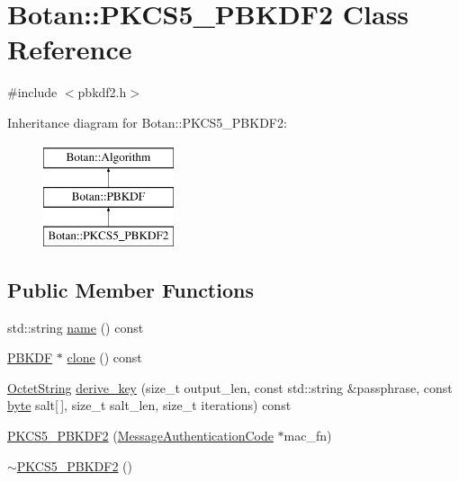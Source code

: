 \hypertarget{classBotan_1_1PKCS5__PBKDF2}{\section{Botan\-:\-:P\-K\-C\-S5\-\_\-\-P\-B\-K\-D\-F2 Class Reference}
\label{classBotan_1_1PKCS5__PBKDF2}
}


{\ttfamily \#include $<$pbkdf2.\-h$>$}

Inheritance diagram for Botan\-:\-:P\-K\-C\-S5\-\_\-\-P\-B\-K\-D\-F2\-:\begin{figure}[H]
\begin{center}
\leavevmode
\includegraphics[height=3.000000cm]{classBotan_1_1PKCS5__PBKDF2}
\end{center}
\end{figure}
\subsection*{Public Member Functions}
\begin{DoxyCompactItemize}
\item 
std\-::string \hyperlink{classBotan_1_1PKCS5__PBKDF2_af422ef3bbc7d0b053fe46a61c310fc0b}{name} () const 
\item 
\hyperlink{classBotan_1_1PBKDF}{P\-B\-K\-D\-F} $\ast$ \hyperlink{classBotan_1_1PKCS5__PBKDF2_a01646d05018139cc33ffca758caae423}{clone} () const 
\item 
\hyperlink{classBotan_1_1OctetString}{Octet\-String} \hyperlink{classBotan_1_1PKCS5__PBKDF2_ae40d8cd687ed0eb081ced526c56cfab4}{derive\-\_\-key} (size\-\_\-t output\-\_\-len, const std\-::string \&passphrase, const \hyperlink{namespaceBotan_a7d793989d801281df48c6b19616b8b84}{byte} salt\mbox{[}$\,$\mbox{]}, size\-\_\-t salt\-\_\-len, size\-\_\-t iterations) const 
\item 
\hyperlink{classBotan_1_1PKCS5__PBKDF2_a7a4e1fb9647f71307db348cb6a166d44}{P\-K\-C\-S5\-\_\-\-P\-B\-K\-D\-F2} (\hyperlink{classBotan_1_1MessageAuthenticationCode}{Message\-Authentication\-Code} $\ast$mac\-\_\-fn)
\item 
\hyperlink{classBotan_1_1PKCS5__PBKDF2_a5199749f1b7f6b2b667013a437d26f37}{$\sim$\-P\-K\-C\-S5\-\_\-\-P\-B\-K\-D\-F2} ()
\end{DoxyCompactItemize}


